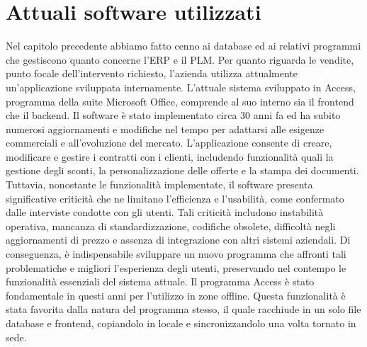 \section{Attuali software utilizzati}
Nel capitolo precedente abbiamo fatto cenno ai database ed ai relativi programmi che gestiscono quanto concerne l'\ac{ERP}
e il \ac{PLM}.
Per quanto riguarda le vendite, punto focale dell'intervento richiesto, l'azienda utilizza attualmente
un'applicazione sviluppata internamente. L'attuale sistema sviluppato in Access, programma della suite Microsoft Office,
comprende al suo interno sia il frontend che il backend. 
Il software è stato implementato circa 30 anni fa ed ha subito numerosi aggiornamenti e
modifiche nel tempo per adattarsi alle esigenze commerciali e all'evoluzione del
mercato. L'applicazione consente di creare, modificare e gestire i contratti con i
clienti, includendo funzionalità quali la gestione degli sconti, la personalizzazione
delle offerte e la stampa dei documenti. Tuttavia, nonostante le funzionalità implementate,
il software presenta significative criticità che ne limitano l'efficienza e
l'usabilità, come confermato dalle interviste condotte con gli utenti. Tali criticità
includono instabilità operativa, mancanza di standardizzazione, codifiche obsolete,
difficoltà negli aggiornamenti di prezzo e assenza di integrazione con altri sistemi
aziendali. Di conseguenza, è indispensabile sviluppare un nuovo programma
che affronti tali problematiche e migliori l'esperienza degli utenti,
preservando nel contempo le funzionalità essenziali del sistema attuale.
Il programma Access è stato fondamentale in questi anni per l'utilizzo in zone offline.
Questa funzionalità è stata favorita dalla natura del programma stesso,
il quale racchiude in un solo file database e frontend,
copiandolo in locale e sincronizzandolo una volta tornato in sede.

